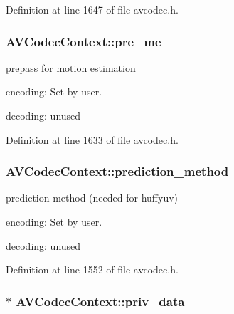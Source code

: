 Definition at line 1647 of file avcodec.\+h.

\subsubsection[{\texorpdfstring{pre\+\_\+me}{pre_me}}]{ A\+V\+Codec\+Context\+::pre\+\_\+me}\hypertarget{struct_a_v_codec_context_a89ad25261c3edb8ad2c6bbbf68d71e58}{}\label{struct_a_v_codec_context_a89ad25261c3edb8ad2c6bbbf68d71e58}
prepass for motion estimation
\begin{DoxyItemize}
\item encoding\+: Set by user.
\item decoding\+: unused 
\end{DoxyItemize}

Definition at line 1633 of file avcodec.\+h.

\subsubsection[{\texorpdfstring{prediction\+\_\+method}{prediction_method}}]{ A\+V\+Codec\+Context\+::prediction\+\_\+method}\hypertarget{struct_a_v_codec_context_abfe2f66459911679409d0b223fcbd522}{}\label{struct_a_v_codec_context_abfe2f66459911679409d0b223fcbd522}
prediction method (needed for huffyuv)
\begin{DoxyItemize}
\item encoding\+: Set by user.
\item decoding\+: unused 
\end{DoxyItemize}

Definition at line 1552 of file avcodec.\+h.

\subsubsection[{\texorpdfstring{priv\+\_\+data}{priv_data}}]{$\ast$ A\+V\+Codec\+Context\+::priv\+\_\+data}\hypertarget{struct_a_v_codec_context_af3379123060ad8cc9c321c29af4f8360}{}\label{struct_a_v_codec_context_af3379123060ad8cc9c321c29af4f8360}



